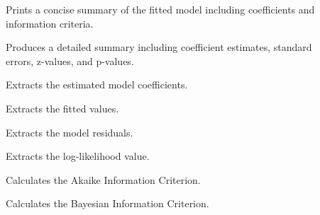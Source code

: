 \documentclass[a4paper]{book}
\begin{document}
%
\begin{Details}
\begin{description}

\item[] Prints a concise summary of the fitted model including coefficients
and information criteria.
\item[] Produces a detailed summary including coefficient estimates,
standard errors, z-values, and p-values.
\item[] Extracts the estimated model coefficients.
\item[] Extracts the fitted values.
\item[] Extracts the model residuals.
\item[] Extracts the log-likelihood value.
\item[] Calculates the Akaike Information Criterion.
\item[] Calculates the Bayesian Information Criterion.

\end{description}

\end{Details}
%
\end{document}
